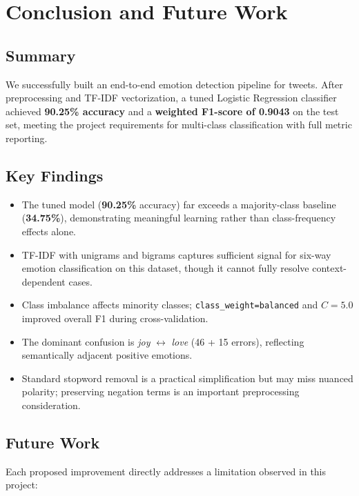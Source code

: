 \documentclass[12pt]{article}
\begin{document}
\section{Conclusion and Future Work}

\subsection{Summary}

We successfully built an end-to-end emotion detection pipeline for tweets.
After preprocessing and TF-IDF vectorization, a tuned Logistic Regression classifier achieved \textbf{90.25\% accuracy} and a \textbf{weighted F1-score of 0.9043} on the test set, meeting the project requirements for multi-class classification with full metric reporting.

\subsection{Key Findings}

\begin{itemize}
    \item The tuned model (\textbf{90.25\%} accuracy) far exceeds a majority-class baseline (\textbf{34.75\%}), demonstrating meaningful learning rather than class-frequency effects alone.
    \item TF-IDF with unigrams and bigrams captures sufficient signal for six-way emotion classification on this dataset, though it cannot fully resolve context-dependent cases.
    \item Class imbalance affects minority classes; \texttt{class\_weight=balanced} and $C=5.0$ improved overall F1 during cross-validation.
    \item The dominant confusion is \textit{joy} $\leftrightarrow$ \textit{love} (46 + 15 errors), reflecting semantically adjacent positive emotions.
    \item Standard stopword removal is a practical simplification but may miss nuanced polarity; preserving negation terms is an important preprocessing consideration.
\end{itemize}

\subsection{Future Work}

Each proposed improvement directly addresses a limitation observed in this project:
\end{document}
